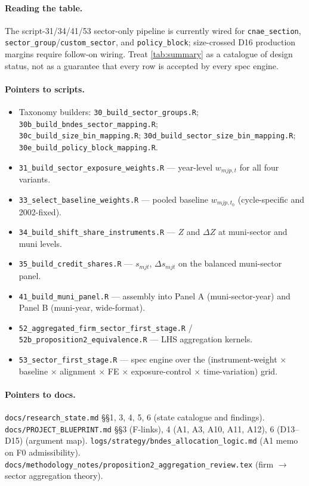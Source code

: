 \documentclass[12pt]{article}
\theoremstyle{definition}
\begin{document}
\paragraph{Reading the table.}
The script-31/34/41/53 sector-only pipeline is currently wired for \texttt{cnae\_section}, \texttt{sector\_group}/\texttt{custom\_sector}, and \texttt{policy\_block}; size-crossed D16 production margins require follow-on wiring. Treat \cref{tab:summary} as a catalogue of design status, not as a guarantee that every row is accepted by every spec engine.

\paragraph{Pointers to scripts.}
\begin{itemize}[leftmargin=2em, itemsep=1pt]
\item Taxonomy builders: \texttt{30\_build\_sector\_groups.R}; \texttt{30b\_build\_bndes\_sector\_mapping.R}; \\
      \texttt{30c\_build\_size\_bin\_mapping.R}; \texttt{30d\_build\_sector\_size\_bin\_mapping.R}; \\
      \texttt{30e\_build\_policy\_block\_mapping.R}.
\item \texttt{31\_build\_sector\_exposure\_weights.R} --- year-level $w_{m j p, t}$ for all four variants.
\item \texttt{33\_select\_baseline\_weights.R} --- pooled baseline $w_{m j p, t_0}$ (cycle-specific and 2002-fixed).
\item \texttt{34\_build\_shift\_share\_instruments.R} --- $Z$ and $\Delta Z$ at muni-sector and muni levels.
\item \texttt{35\_build\_credit\_shares.R} --- $s_{m j t}$, $\Delta s_{m j t}$ on the balanced muni-sector panel.
\item \texttt{41\_build\_muni\_panel.R} --- assembly into Panel A (muni-sector-year) and Panel B (muni-year, wide-format).
\item \texttt{52\_aggregated\_firm\_sector\_first\_stage.R} / \texttt{52b\_proposition2\_equivalence.R} --- LHS aggregation kernels.
\item \texttt{53\_sector\_first\_stage.R} --- spec engine over the (instrument-weight $\times$ baseline $\times$ alignment $\times$ FE $\times$ exposure-control $\times$ time-variation) grid.
\end{itemize}

\paragraph{Pointers to docs.}
\texttt{docs/research\_state.md} \S\S1, 3, 4, 5, 6 (state catalogue and findings).
\texttt{docs/PROJECT\_BLUEPRINT.md} \S\S3 (F-links), 4 (A1, A3, A10, A11, A12), 6 (D13--D15) (argument map).
\texttt{logs/strategy/bndes\_allocation\_logic.md} (A1 memo on F0 admissibility).
\texttt{docs/methodology\_notes/proposition2\_aggregation\_review.tex} (firm $\to$ sector aggregation theory).
\end{document}

